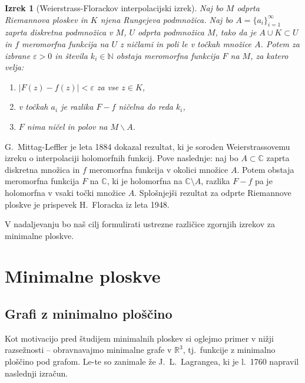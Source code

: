 \documentclass[12pt,a4paper,twoside]{article}
\theoremstyle{definition} %
\theoremstyle{plain} %
\newtheorem{izrek}[definicija]{Izrek}
\numberwithin{equation}{section}  %
\newcommand{\R}{\mathbb R}
\newcommand{\N}{\mathbb N}
\newcommand{\C}{\mathbb C}
\begin{document}
\begin{izrek} [Weierstrass-Florackov interpolacijski izrek] \label{izr:Weierstrass-Florack}
Naj bo $M$ odprta Riemannova ploskev in $K$ njena Rungejeva podmnožica. Naj bo $A = \{ a_i \}_{i=1}^{\infty}$ zaprta diskretna podmnožica v $M$, $U$ odprta podmnožica $M$, tako da je $A \cup K \subset U$ in $f$ meromorfna funkcija na $U$ z ničlami in poli le v točkah množice $A$.
Potem za izbrane $\varepsilon > 0$ in števila $k_{i} \in \N$ obstaja meromorfna funkcija $F$ na $M$, za katero velja:
\begin{enumerate}
\item $|F(z) - f(z)| < \varepsilon$ za vse $z \in K$,
\item v točkah $a_i$ je razlika $F-f$ ničelna do reda $k_i$,
\item $F$ nima ničel in polov na $M \backslash A$.
\end{enumerate} 
\end{izrek}

G.~Mittag-Leffler je leta 1884 dokazal rezultat, ki je soroden Weierstrassovemu izreku o interpolaciji holomorfnih funkcij. Pove naslednje:
naj bo $A \subset \C$ zaprta diskretna množica in $f$ meromorfna funkcija v okolici množice $A$. Potem obstaja meromorfna funkcija $F$ na $\C$, ki je holomorfna na $\C \setminus A$, razlika $F-f$ pa je holomorfna v vsaki točki množice $A$. \newline
Splošnjejši rezultat za odprte Riemannove ploskve je prispevek H.~Floracka iz leta 1948. \newline

V nadaljevanju bo naš cilj formulirati ustrezne različice zgornjih izrekov za minimalne ploskve.

\section{Minimalne ploskve}

\subsection{Grafi z minimalno ploščino}
%
Kot motivacijo pred študijem minimalnih ploskev si oglejmo primer v nižji razsežnosti -- obravnavajmo minimalne grafe v $\R^3$, tj.~funkcije z minimalno ploščino pod grafom. Le-te so zanimale že J.~L.~Lagrangea, ki je l.~1760 napravil naslednji izračun. 
\end{document}
